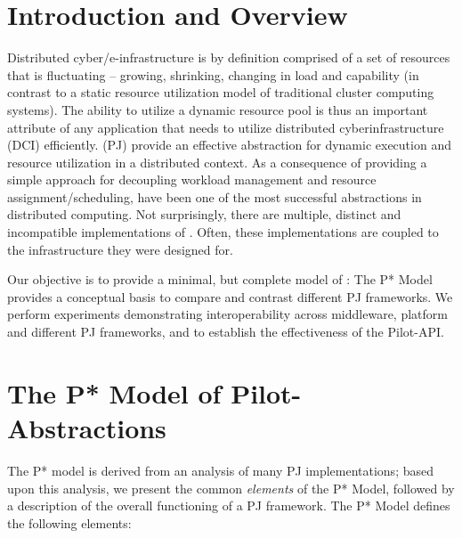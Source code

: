 \documentclass{sig-alternate}
\begin{document}



\upp
\section{Introduction and Overview} 

Distributed cyber/e-infrastructure is by definition comprised of a set
of resources that is fluctuating -- growing, shrinking, changing in
load and capability (in contrast to a static resource utilization
model of traditional cluster computing systems).  The
ability to utilize a dynamic resource pool is thus an important
attribute of any application that needs to utilize distributed
cyberinfrastructure (DCI) efficiently. \pilotjobs (PJ) provide an
effective abstraction for dynamic execution and resource utilization
in a distributed context. As a consequence of providing a simple
approach for decoupling workload management and resource
assignment/scheduling, \pilotjobs have been one of the most successful
abstractions in distributed computing.  Not surprisingly, there are
multiple, distinct and incompatible implementations of
\pilotjobs. Often, these implementations are coupled to the
infrastructure they were designed for.

Our objective is to provide a minimal, but complete model of
\pilotjobs: The P* Model provides a conceptual basis to compare and
contrast different PJ frameworks.  We perform experiments
demonstrating interoperability across middleware, platform and
different PJ frameworks, and to establish the effectiveness of the
Pilot-API.


\section{The P* Model of Pilot-\\Abstractions}
\label{sec:pilot-model}

The P* model is derived from an analysis of many PJ implementations;
based upon this analysis, we present the common {\it elements} of the P*
Model, followed by a description of the overall functioning of a PJ framework. 
The P* Model defines the following elements:
\end{document}
